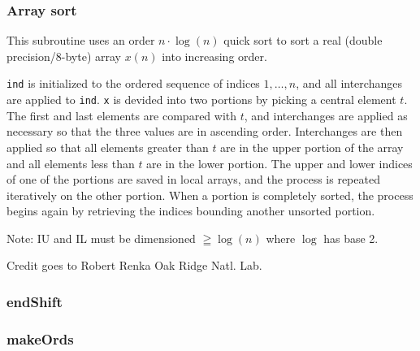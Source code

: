 \subsubsection{Array sort}


This subroutine uses an order $n\cdot\log(n)$ quick sort to sort
a real (double precision/8-byte) array $x(n)$ into increasing order.


\texttt{ind} is initialized to the ordered sequence of indices $1,\ldots,n$,
and all interchanges are applied to \texttt{ind}. \texttt{x} is devided
into two portions by picking a central element $t$. The first and
last elements are compared with $t$, and interchanges are applied
as necessary so that the three values are in ascending order. Interchanges
are then applied so that all elements greater than $t$ are in the
upper portion of the array and all elements less than $t$ are in
the lower portion. The upper and lower indices of one of the portions
are saved in local arrays, and the process is repeated iteratively
on the other portion. When a portion is completely sorted, the process
begins again by retrieving the indices bounding another unsorted portion.

Note: IU and IL must be dimensioned $\geqq\log(n)$ where $\log$
has base 2.

Credit goes to Robert Renka Oak Ridge Natl. Lab.

\subsubsection{endShift}



\subsubsection{makeOrds}

